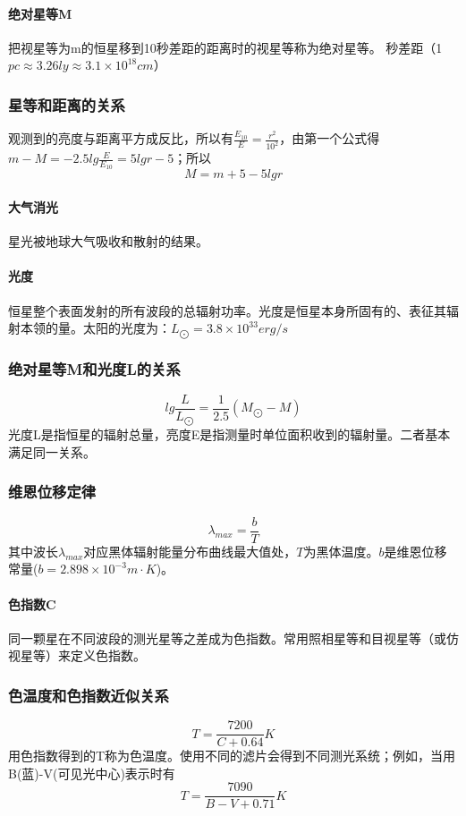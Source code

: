\documentclass[%
 reprint,
 amsmath,amssymb,
 aps,
]{revtex4-1}
\begin{document}
\paragraph{绝对星等M} 把视星等为m的恒星移到10秒差距的距离时的视星等称为绝对星等。 秒差距（1$pc \approx 3.26 ly \approx 3.1\times10^{18} cm$）

\subsubsection{星等和距离的关系}
观测到的亮度与距离平方成反比，所以有$\frac{E_{10}}{E} = \frac{r^2}{10^2}$，由第一个公式得$m - M = - 2.5lg \frac{E}{E_{10}} = 5lgr - 5$；所以$$M = m+5 - 5lgr$$

\paragraph{大气消光}星光被地球大气吸收和散射的结果。

\paragraph{光度}恒星整个表面发射的所有波段的总辐射功率。光度是恒星本身所固有的、表征其辐射本领的量。太阳的光度为：$L_{\bigodot} = 3.8\times 10^{33} erg/s$

\subsubsection{绝对星等M和光度L的关系}
$$lg\frac{L}{L_{\bigodot}} = \frac{1}{2.5}(M_{\bigodot} - M)$$
光度L是指恒星的辐射总量，亮度E是指测量时单位面积收到的辐射量。二者基本满足同一关系。

\subsubsection{维恩位移定律}
$$\lambda_{max} = \frac{b}{T}$$
其中波长$\lambda_{max}$对应黑体辐射能量分布曲线最大值处，$T$为黑体温度。$b$是维恩位移常量($b=2.898\times 10^{-3} m \cdot K$)。

\paragraph{色指数C}同一颗星在不同波段的测光星等之差成为色指数。常用照相星等和目视星等（或仿视星等）来定义色指数。

\subsubsection{色温度和色指数近似关系}
$$T = \frac{7200}{C + 0.64}K$$
用色指数得到的T称为色温度。使用不同的滤片会得到不同测光系统；例如，当用B(蓝)-V(可见光中心)表示时有
$$T = \frac{7090}{B - V + 0.71}K$$
\end{document}
